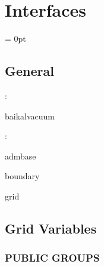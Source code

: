 
\section{Interfaces} 


\parskip = 0pt

\vspace{3mm} \subsection*{General}

: 

baikalvacuum
\vspace{2mm}

: 

admbase

boundary

grid
\vspace{2mm}
\subsection*{Grid Variables}
\vspace{5mm}\subsubsection{PUBLIC GROUPS}

\vspace{5mm}

